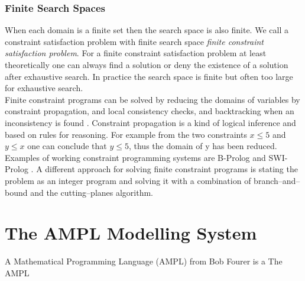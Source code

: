 \subsubsection{Finite Search Spaces}
When each domain is a finite set then the search space is also finite. We call a constraint satisfaction problem with finite search space \emph{finite constraint satisfaction problem}. For a finite constraint satisfaction problem at least theoretically one can always find a solution or deny the existence of a solution after exhaustive search. In practice the search space is finite but often too large for exhaustive search.\\
Finite constraint programs can be solved by reducing the domains of variables by constraint propagation, and local consistency checks, and backtracking when an inconsistency is found \cite{ConstraintPropagation}. Constraint propagation is a kind of logical inference and based on rules for reasoning. For example from the two constraints $x\leq 5$ and $y \leq x$ one can conclude that $y\leq 5$, thus the domain of y has been reduced. Examples of working constraint programming systems are B-Prolog and SWI-Prolog \cite{citation needed}. %
A different approach for solving finite constraint programs is stating the problem as an integer program and solving it with a combination of branch--and--bound and the cutting--planes algorithm.

\section{The AMPL Modelling System}
\label{sec:AMPL}
A Mathematical Programming Language (AMPL) from Bob Fourer \cite{AMPL} is a The AMPL 


